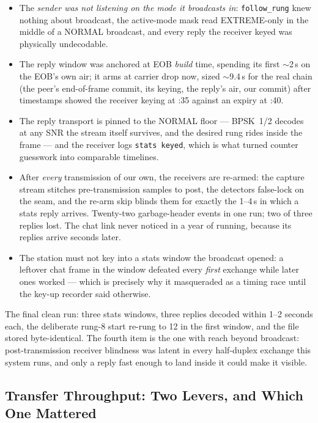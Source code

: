 \begin{itemize}
\item The \emph{sender was not listening on the mode it broadcasts
      in}: \texttt{follow\_rung} knew nothing about broadcast, the
      active-mode mask read EXTREME-only in the middle of a NORMAL
      broadcast, and every reply the receiver keyed was physically
      undecodable.
\item The reply window was anchored at EOB \emph{build} time,
      spending its first $\sim$2\,s on the EOB's own air; it arms at
      carrier drop now, sized $\sim$9.4\,s for the real chain (the
      peer's end-of-frame commit, its keying, the reply's air, our
      commit) after timestamps showed the receiver keying at :35
      against an expiry at :40.
\item The reply transport is pinned to the NORMAL floor --- BPSK~1/2
      decodes at any SNR the stream itself survives, and the desired
      rung rides inside the frame --- and the receiver logs
      \texttt{stats keyed}, which is what turned counter guesswork
      into comparable timelines.
\item After \emph{every} transmission of our own, the receivers are
      re-armed: the capture stream stitches pre-transmission samples
      to post, the detectors false-lock on the seam, and the re-arm
      skip blinds them for exactly the 1--4\,s in which a stats reply
      arrives. Twenty-two garbage-header events in one run; two of
      three replies lost. The chat link never noticed in a year of
      running, because its replies arrive seconds later.
\item The station must not key into a stats window the broadcast
      opened: a leftover chat frame in the window defeated every
      \emph{first} exchange while later ones worked --- which is
      precisely why it masqueraded as a timing race until the key-up
      recorder said otherwise.
\end{itemize}

The final clean run: three stats windows, three replies decoded within
1--2 seconds each, the deliberate rung-8 start re-rung to 12 in the
first window, and the file stored byte-identical. The fourth item is
the one with reach beyond broadcast: post-transmission receiver
blindness was latent in every half-duplex exchange this system runs,
and only a reply fast enough to land inside it could make it visible.

\subsection{Transfer Throughput: Two Levers, and Which One Mattered}
\label{sec:cport_levers}

